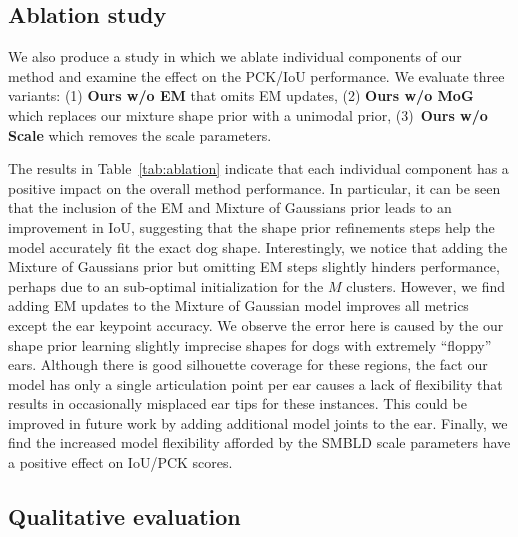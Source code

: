\subsection{Ablation study}

We also produce a study in which we ablate individual components of our method and examine the effect on the PCK/IoU performance. We evaluate three variants: (1) \textbf{Ours w/o EM} that omits EM updates, (2) \textbf{Ours w/o MoG} which replaces our mixture shape prior with a unimodal prior, (3)~\textbf{Ours w/o Scale} which removes the scale parameters. 

The results in Table~\ref{tab:ablation} indicate that each individual component has a positive impact on the overall method performance. In particular, it can be seen that the inclusion of the EM and Mixture of Gaussians prior leads to an improvement in IoU, suggesting that the shape prior refinements steps help the model accurately fit the exact dog shape. Interestingly, we notice that adding the Mixture of Gaussians prior but omitting EM steps slightly hinders performance, perhaps due to an sub-optimal initialization for the $M$ clusters. However, we find adding EM updates to the Mixture of Gaussian model improves all metrics except the ear keypoint accuracy. We observe the error here is caused by the our shape prior learning slightly imprecise shapes for dogs with extremely ``floppy'' ears. Although there is good silhouette coverage for these regions, the fact our model has only a single articulation point per ear causes a lack of flexibility that results in occasionally misplaced ear tips for these instances. This could be improved in future work by adding additional model joints to the ear. Finally, we find the increased model flexibility afforded by the SMBLD scale parameters have a positive effect on IoU/PCK scores. 


% 
% 

\subsection{Qualitative evaluation}


